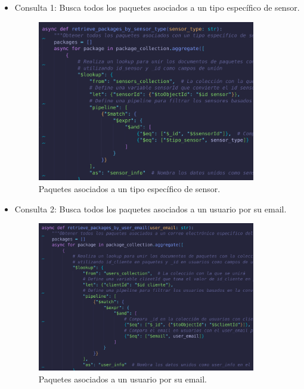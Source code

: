 \begin{itemize}
    \item Consulta 1: Busca todos los paquetes asociados a un tipo específico de sensor. 
    \begin{figure}[H]
      \centering
      \includegraphics[width=0.9\textwidth]{Figures/1. Content/retrieve_packages_by_sensor_type.png}
      \caption{Paquetes asociados a un tipo específico de sensor.}
      \label{fig:retrieve_packages_by_sensor_type}
    \end{figure}

    \item Consulta 2: Busca todos los paquetes asociados a un usuario por su email.
      
  \begin{figure}[H]
    \centering
    \includegraphics[width=0.9\textwidth]{Figures/1. Content/retrieve_packages_by_user_email.png}
    \caption{Paquetes asociados a un usuario por su email.}
    \label{fig:retrieve_packages_by_user_email}
  \end{figure}
\end{itemize}


